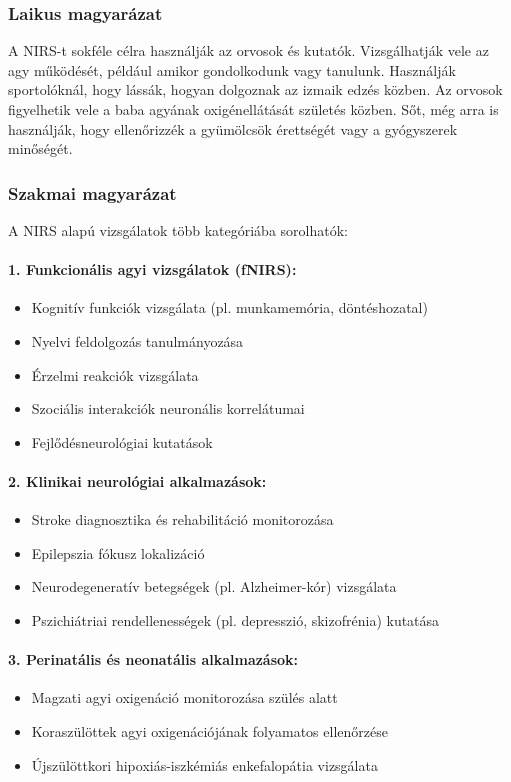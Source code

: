 \documentclass[a4paper,12pt]{article}
\begin{document}
\subsubsection{Laikus magyarázat} A NIRS-t sokféle célra használják az orvosok és kutatók. Vizsgálhatják vele az agy működését, például amikor gondolkodunk vagy tanulunk. Használják sportolóknál, hogy lássák, hogyan dolgoznak az izmaik edzés közben. Az orvosok figyelhetik vele a baba agyának oxigénellátását születés közben. Sőt, még arra is használják, hogy ellenőrizzék a gyümölcsök érettségét vagy a gyógyszerek minőségét.

\subsubsection{Szakmai magyarázat} A NIRS alapú vizsgálatok több kategóriába sorolhatók:

\paragraph{1. Funkcionális agyi vizsgálatok (fNIRS):} \begin{itemize} \item Kognitív funkciók vizsgálata (pl. munkamemória, döntéshozatal) \item Nyelvi feldolgozás tanulmányozása \item Érzelmi reakciók vizsgálata \item Szociális interakciók neuronális korrelátumai \item Fejlődésneurológiai kutatások \end{itemize}

\paragraph{2. Klinikai neurológiai alkalmazások:} \begin{itemize} \item Stroke diagnosztika és rehabilitáció monitorozása \item Epilepszia fókusz lokalizáció \item Neurodegeneratív betegségek (pl. Alzheimer-kór) vizsgálata \item Pszichiátriai rendellenességek (pl. depresszió, skizofrénia) kutatása \end{itemize}

\paragraph{3. Perinatális és neonatális alkalmazások:} \begin{itemize} \item Magzati agyi oxigenáció monitorozása szülés alatt \item Koraszülöttek agyi oxigenációjának folyamatos ellenőrzése \item Újszülöttkori hipoxiás-iszkémiás enkefalopátia vizsgálata \end{itemize}
\end{document}

